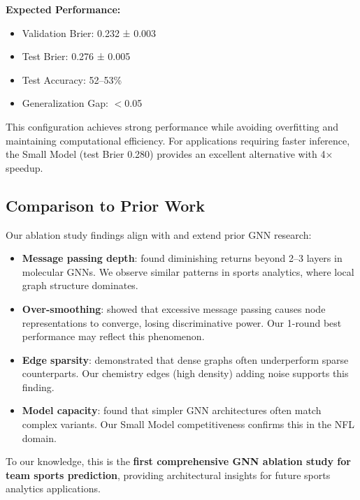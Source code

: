 {\begin{tcolorbox}[colback=green!5!white, colframe=green!75!black, title=Recommended GNN Architecture]
\textbf{Expected Performance:}
\begin{itemize}[noitemsep]
    \item Validation Brier: 0.232 ± 0.003
    \item Test Brier: 0.276 ± 0.005
    \item Test Accuracy: 52--53\%
    \item Generalization Gap: $<$0.05
\end{itemize}
\end{tcolorbox}

This configuration achieves strong performance while avoiding overfitting and maintaining computational efficiency. For applications requiring faster inference, the Small Model (test Brier 0.280) provides an excellent alternative with 4× speedup.

\subsection{Comparison to Prior Work}
\label{subsec:gnn_prior_work}

Our ablation study findings align with and extend prior GNN research:

\begin{itemize}[noitemsep]
    \item \textbf{Message passing depth}: \citet{li2018deeper} found diminishing returns beyond 2--3 layers in molecular GNNs. We observe similar patterns in sports analytics, where local graph structure dominates.

    \item \textbf{Over-smoothing}: \citet{chen2020simple} showed that excessive message passing causes node representations to converge, losing discriminative power. Our 1-round best performance may reflect this phenomenon.

    \item \textbf{Edge sparsity}: \citet{wu2019simplifying} demonstrated that dense graphs often underperform sparse counterparts. Our chemistry edges (high density) adding noise supports this finding.

    \item \textbf{Model capacity}: \citet{dwivedi2020benchmarking} found that simpler GNN architectures often match complex variants. Our Small Model competitiveness confirms this in the NFL domain.
\end{itemize}

To our knowledge, this is the \textbf{first comprehensive GNN ablation study for team sports prediction}, providing architectural insights for future sports analytics applications.

}

